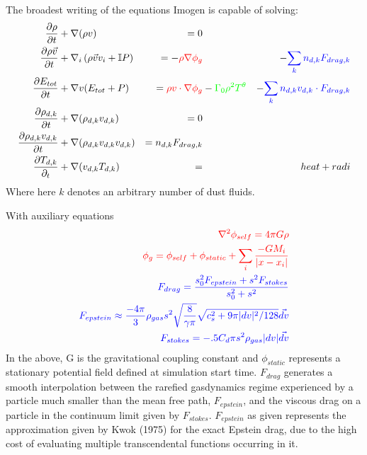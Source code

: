 \documentclass[letterpaper,12pt]{article}
\begin{document}
The broadest writing of the equations Imogen is capable of solving:
\begin{align*}
\frac{\partial \rho}{\partial t} &+ \nabla (\rho v) &= 0 & & \\
\frac{\partial \rho \vec{v}}{\partial t} &+ \nabla_i \left( \rho \vec{v} v_i + \mathbb{I} P \right) &= 
- \textcolor{red}{\rho \nabla \phi_g } & & - 
\textcolor{blue}{ \sum_k n_{d,k} F_{drag,k}  }\\
\frac{\partial E_{tot}}{\partial t} &+ \nabla v (E_{tot} + P) &= 
\textcolor{red}{\rho v \cdot \nabla \phi_g} & 
- \textcolor{green}{\Gamma_0 \rho^2 T^\theta } &
- \textcolor{blue}{\sum_k n_{d,k} v_{d,k} \cdot F_{drag,k}} \\
\frac{\partial \rho_{d,k}}{\partial t} &+ \nabla (\rho_{d,k} v_{d,k}) &= 0 & & \\
\frac{\partial \rho_{d,k} v_{d,k}}{\partial t} &+ \nabla (\rho_{d,k} v_{d,k} v_{d,k}) &= n_{d,k} F_{drag,k}  & & \\
\frac{\partial T_{d,k}}{\partial_t} &+ \nabla (v_{d,k} T_{d,k} ) &= & & heat+radi
\end{align*}
Where here $k$ denotes an arbitrary number of dust fluids.

With auxiliary equations
\begin{align*}
\textcolor{red}{\nabla^2 \phi_{self} = 4 \pi G \rho} \\
\textcolor{red}{\phi_g = \phi_{self} + \phi_{static} + \sum_{i} \frac{-G M_i}{|x - x_i|} } \\
\textcolor{blue}{F_{drag} = \frac{s_0^2 F_{epstein} + s^2 F_{stokes}}{s_0^2 + s^2}} \\
\textcolor{blue}{F_{epstein} \approx \frac{-4 \pi}{3} \rho_{gas} s^2 \sqrt{\frac{8}{\gamma \pi}} \sqrt{c_s^2 + 9 \pi |dv|^2 / 128}  \vec{dv} } \\
\textcolor{blue}{F_{stokes} = -.5 C_d \pi s^2 \rho_{gas} |dv| \vec{dv} }
\end{align*}
In the above, G is the gravitational coupling constant and $\phi_{static}$ represents a stationary
potential field defined at simulation start time.
$F_{drag}$ generates a smooth interpolation between the rarefied gasdynamics regime experienced
by a particle much smaller than the mean free path, $F_{epstein}$, and the viscous drag 
on a particle in the continuum limit given by $F_{stokes}$.
$F_{epstein}$ as given represents the approximation
given by Kwok (1975) for the exact Epstein drag, due to the high cost of evaluating multiple
transcendental functions occurring in it.
\end{document}
